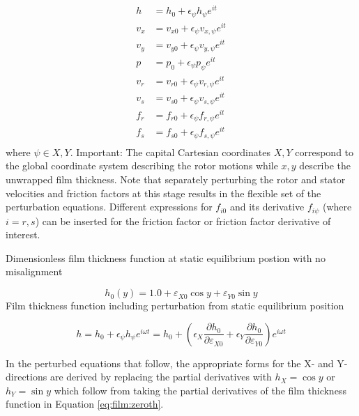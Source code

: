 \documentclass[12pt,letterpaper]{article}
\begin{document}
\begin{align*}
h &=   h_0 +    \epsilon_{\psi} h_{\psi}    e^{i t} \\
v_x &= v_{x0} + \epsilon_{\psi} v_{x,\psi} e^{i  t} \\
v_y &= v_{y0} + \epsilon_{\psi} v_{y,\psi} e^{i t} \\
p &=   p_0 +    \epsilon_{\psi} p_{\psi}    e^{i t} \\
v_r &= v_{r0} + \epsilon_{\psi} v_{r,\psi} e^{i t} \\
v_s &= v_{s0} + \epsilon_{\psi} v_{s,\psi} e^{i t} \\
f_r &= f_{r0} + \epsilon_{\psi} f_{r,\psi} e^{i t} \\
f_s &= f_{s0} + \epsilon_{\psi} f_{s,\psi} e^{i t} \\
\end{align*}
%
where $\psi \in X,Y$. Important: The capital Cartesian coordinates
$X,Y$ correspond to the global coordinate system describing
the rotor motions while $x,y$ describe the unwrapped film thickness.
Note that separately perturbing the rotor
and stator velocities and friction factors at this
stage results in the flexible
set of the perturbation equations. Different
expressions for
$f_{i0}$ and its derivative $f_{i \psi}$ (where
$i=r,s$) can be inserted for
the friction factor or friction factor derivative of
interest.

Dimensionless film thickness function at static equilibrium
postion with no misalignment

\begin{equation} \label{eq:film:zeroth}
h_0(y) = 1.0 + \varepsilon_{X0} \cos{y} + \varepsilon_{Y0} \sin{y}
\end{equation}
%
Film thickness function including perturbation from static
equilibrium position

\begin{equation} \label{eq:film:pert}
h = h_0 + \epsilon_{\psi} h_{\psi}  e^{i \omega t} =
  h_0 + \left(
 \epsilon_{X} \frac{\partial h_0}{\partial \varepsilon_{X0}} +
 \epsilon_{Y} \frac{\partial h_0}{\partial \varepsilon_{Y0}}
 \right) e^{i \omega t}
\end{equation}

In the perturbed equations that follow, the appropriate
forms for the X- and Y-directions are derived by replacing the partial
derivatives with
$h_X = \cos{y}$ or $h_Y = \sin{y}$ which follow from taking the
partial derivatives of the film thickness function
in Equation \ref{eq:film:zeroth}.
\end{document}
